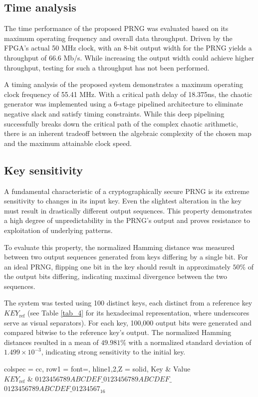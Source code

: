\documentclass[preprint, 12pt, sort&compress]{elsarticle}
\begin{document}
{
  \color{red} 
\subsection{Time analysis}
The time performance of the proposed PRNG was evaluated based on its maximum operating frequency and overall data throughput. Driven by the FPGA's actual 50 MHz clock, with an 8-bit output width for the PRNG yields a throughput of 66.6 Mb/s. While increasing the output width could achieve higher throughput, testing for such a throughput has not been performed.

A timing analysis of the proposed system demonstrates a maximum operating clock frequency of 55.41 MHz. With a critical path delay of 18.375ns, the chaotic generator was implemented using a 6-stage pipelined architecture to eliminate negative slack and satisfy timing constraints. While this deep pipelining successfully breaks down the critical path of the complex chaotic arithmetic, there is an inherent tradeoff between the algebraic complexity of the chosen map and the maximum attainable clock speed. 
}
\subsection{Key sensitivity}
A fundamental characteristic of a cryptographically secure PRNG is its extreme sensitivity to changes in its input key. Even the slightest alteration in the key must result in drastically different output sequences. This property demonstrates a high degree of unpredictability in the PRNG's output and proves resistance to exploitation of underlying patterns.

To evaluate this property, the normalized Hamming distance was measured between two output sequences generated from keys differing by a single bit. For an ideal PRNG, flipping one bit in the key should result in approximately $50\%$ of the output bits differing, indicating maximal divergence between the two sequences.

{\color{red}
The system was tested using 100 distinct keys, each distinct from a reference key $KEY_\text{ref}$ (see Table \ref{tab_4} for its hexadecimal representation, where underscores serve as visual separators). For each key, 100,000 output bits were generated and compared bitwise to the reference key's output. The normalized Hamming distances resulted in a mean of $49.981\%$ with a normalized standard deviation of $1.499 \times 10^{-3}$,  indicating strong sensitivity to the initial key.
}
\begin{table}[htb]
\centering
\caption{Key reference for Hamming distance.}
\label{tab_4}
\begin{tblr}{
  colspec = {cc},
  row{1} = {font=\bfseries},
  hline{1,2,Z} = {solid},
}
Key & Value \\
$KEY_\text{ref}$ & {$0123456789ABCDEF\_0123456789ABCDEF\_$ \\ $0123456789ABCDEF\_01234567_{16}$}
\end{tblr}
\end{table}
\end{document}
